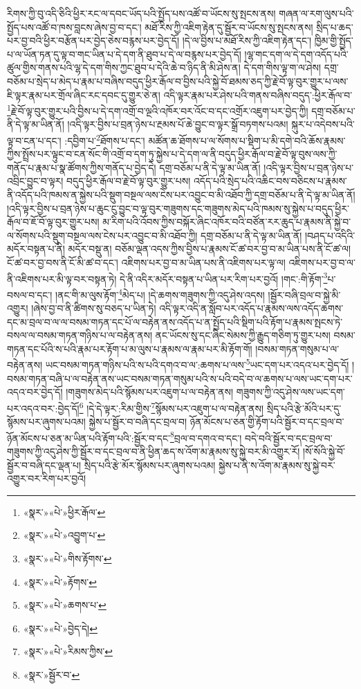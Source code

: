རིགས་ཀྱི་བུ་འདི་ཅིའི་ཕྱིར་རང་ལ་དབང་ཡོད་པའི་སྤྱོད་པས་འཚོ་བ་ཡོངས་སུ་སྤངས་ནས། གཞན་ལ་རག་ལུས་པའི་སྤྱོད་པས་འཚོ་བ་ཁས་བླངས་ཞེས་བྱ་བ་དང་། མཐོ་རིས་ཀྱི་འཇིག་རྟེན་དུ་སྦྱོར་བ་ཡོངས་སུ་སྤངས་ནས། སྲིད་པ་ཆད་པར་བྱ་བའི་ཕྱིར་བརྩོན་པར་བྱེད་ཅེས་བརྙས་པར་བྱེད་དོ། །དེ་ལ་བྱིས་པ་མཐོ་རིས་ཀྱི་འཇིག་རྟེན་དང་། ཁྱིམ་གྱི་སྤྱོད་པ་ལ་ཡོན་ཏན་དུ་ལྟ་བ་གང་ཡིན་པ་དེ་དག་ནི་ཐུབ་པ་དེ་ལ་བརྙས་པར་བྱེད་དོ། །ལྷ་གང་དག་ལ་དེ་དག་འདོད་པའི་ཚུལ་གྱིས་གནས་པའི་ལྷ་དེ་དག་གིས་ཀྱང་ཐུབ་པ་དེའི་ཆེ་བ་ཉིད་ནི་མི་ཤེས་ན། དེ་དག་གིས་ལྟ་ག་ལ་ཤེས། དགྲ་བཅོམ་པ་སྲེད་པ་མེད་པ་རྣམ་པ་བཞིས་བདུད་ཕྱིར་རྒོལ་བ་བྱིས་པའི་སྐྱེ་བོ་ཐམས་ཅད་ཀྱི་རྗེ་བོ་ལྟ་བུར་གྱུར་པ་ལས་ཇི་ལྟར་རྣམ་པར་གྲོལ་ཞིང་རང་དབང་དུ་གྱུར་ཅེ་ན། འདི་ལྟར་རྣམ་པར་ཤེས་པའི་གནས་བཞིས་བདུད་:ཕྱིར་རྒོལ་བ་\footnote{«སྣར་»«པེ་»ཕྱིར་རྒོལ་}རྗེ་བོ་ལྟ་བུར་གྱུར་པའི་བྱིས་པ་དེ་དག་འགྲོ་བ་ལྔའི་འཁོར་བར་འོང་བ་དང་འགྲོར་འཇུག་པར་བྱེད་ཀྱི། དགྲ་བཅོམ་པ་ནི་དེ་ལྟ་མ་ཡིན་ནོ། །འདི་ལྟར་བྱིས་པ་བྲན་ཉེས་པ་རྔམས་པོ་ཆེ་བྱུང་བ་ལྟར་སྒྲོ་བཏགས་པའམ། སྐུར་པ་འདེབས་པའི་ལྟ་བ་ངན་པ་དང་། :དབྱིག་པ་\footnote{«སྣར་»«པེ་»འབྱུག་པ་}ཐོགས་པ་དང་། མཚོན་ཆ་ཐོགས་པ་ལ་སོགས་པ་སྡིག་པ་མི་དགེ་བའི་ཆོས་རྣམས་ཀྱིས་སྤྲོས་པར་ལྟུང་བ་ངན་སོང་གི་འགྲོ་བ་དག་ཏུ་སྐྱེས་པ་དེ་དག་ལ་ནི་བདུད་ཕྱིར་རྒོལ་བ་རྗེ་བོ་ལྟ་བུས་ལས་ཀྱི་གནོད་པ་རྣམ་པ་སྣ་ཚོགས་ཀྱིས་གནོད་པ་བྱེད་དེ། དགྲ་བཅོམ་པ་ནི་དེ་ལྟ་མ་ཡིན་ནོ། །འདི་ལྟར་བྱིས་པ་བྲན་ཉེས་པ་འབྲིང་བྱུང་བ་ལྟར། བདུད་ཕྱིར་རྒོལ་བ་རྗེ་བོ་ལྟ་བུར་གྱུར་པས། འདོད་པའི་སྲེད་པའི་འཆིང་བས་བཅིངས་པ་རྣམས་ནི་འདོད་པའི་ཁམས་ན་སྐྱེས་པའི་སྡུག་བསྔལ་ལས་ངེས་པར་འབྱུང་བ་མི་འཐོབ་ཀྱི་དགྲ་བཅོམ་པ་ནི་དེ་ལྟ་མ་ཡིན་ནོ། །འདི་ལྟར་བྱིས་པ་བྲན་ཉེས་པ་ཆུང་ངུ་བྱུང་བ་ལྟ་བུར་གཟུགས་དང་གཟུགས་མེད་པའི་ཁམས་སུ་སྐྱེས་པ་བདུད་ཕྱིར་རྒོལ་བ་ཇོ་བོ་ལྟ་བུར་གྱུར་པས། མ་རིག་པའི་འོབས་ཀྱིས་བསྐོར་ཞིང་འཁོར་བའི་བཙོན་རར་ཆུད་པ་རྣམས་ནི་སྐྱེ་བ་ལ་སོགས་པའི་སྡུག་བསྔལ་ལས་ངེས་པར་འབྱུང་བ་མི་འཐོབ་ཀྱི། དགྲ་བཅོམ་པ་ནི་དེ་ལྟ་མ་ཡིན་ནོ། །བཤད་པ་འདིའི་མདོར་བསྟན་པ་ནི། མདོར་བསྡུ་ན། བཅོམ་ལྡན་འདས་ཀྱིས་བྱིས་པ་རྣམས་ངོ་ཚ་བར་བྱ་བ་མ་ཡིན་པས་ནི་ངོ་ཚ་ལ། ངོ་ཚ་བར་བྱ་བས་ནི་ངོ་མི་ཚ་བ་དང་། འཇིགས་པར་བྱ་བ་མ་ཡིན་པས་ནི་འཇིགས་པར་ལྟ་ལ། འཇིགས་པར་བྱ་བ་ལ་ནི་འཇིགས་པར་མི་ལྟ་བར་བསྟན་ཏེ། དེ་ནི་འདིར་མདོར་བསྟན་པ་ཡིན་པར་རིག་པར་བྱའོ། །གང་:གི་རྟོག་\footnote{«སྣར་»«པེ་»གིས་རྟོགས་}པ་བསལ་བ་དང་། །ནང་གི་མ་ལུས་རྟོག་\footnote{«སྣར་»«པེ་»རྟོགས་}མེད་པ། །དེ་ཆགས་གཟུགས་ཀྱི་འདུ་ཤེས་འདས། །སྦྱོར་བཞི་བྲལ་བ་སྐྱེ་མི་འགྱུར། །ཞེས་བྱ་བ་ནི་ཚིགས་སུ་བཅད་པ་ཡིན་ཏེ། འདི་ལྟར་འདི་ན་སློབ་པར་འདོད་པ་རྣམས་ལས་འདོད་ཆགས་དང་མ་བྲལ་བ་ལ་ལ་བསམ་གཏན་དང་པོ་ལ་བརྟེན་ནས་འདོད་པ་ན་སྤྱོད་པའི་སྡིག་པའི་རྟོག་པ་རྣམས་སྤངས་ཏེ་བསལ་ལ་བསམ་གཏན་གཉིས་པ་ལ་བརྟེན་ནས། ནང་ཡོངས་སུ་དང་ཞིང་སེམས་ཀྱི་རྒྱུད་གཅིག་ཏུ་གྱུར་པས། བསམ་གཏན་དང་པོའི་ས་པའི་རྣམ་པར་རྟོག་པ་མ་ལུས་པ་རྣམས་ལ་རྣམ་པར་མི་རྟོག་གོ། །བསམ་གཏན་གསུམ་པ་ལ་བརྟེན་ནས། ཡང་བསམ་གཏན་གཉིས་པའི་ས་པའི་དགའ་བ་ལ་:ཆགས་པ་ལས་\footnote{«སྣར་»«པེ་»ཆགས་པ་}ཡང་དག་པར་འདའ་པར་བྱེད་དོ། །བསམ་གཏན་བཞི་པ་ལ་བརྟེན་ནས་ཡང་བསམ་གཏན་གསུམ་པའི་ས་པའི་བདེ་བ་ལ་ཆགས་པ་ལས་ཡང་དག་པར་འདའ་བར་བྱེད་དོ། །གཟུགས་མེད་པའི་སྙོམས་པར་འཇུག་པ་ལ་བརྟེན་ནས། གཟུགས་ཀྱི་འདུ་ཤེས་ལས་ཡང་དག་པར་འདའ་བར་:བྱེད་དོ།\footnote{«སྣར་»«པེ་»བྱེད་དེ།} །དེ་དེ་ལྟར་:རིམ་གྱིས་\footnote{«སྣར་»«པེ་»རིམས་ཀྱིས་}སྙོམས་པར་འཇུག་པ་ལ་བརྟེན་ནས། སྲིད་པའི་རྩེ་མོའི་པར་དུ་སྙོམས་པར་ཞུགས་པའམ། སྐྱེས་པ་སྦྱོར་བ་བཞི་དང་བྲལ་བ། ཉོན་མོངས་པ་ཅན་གྱི་རྟོག་པའི་སྦྱོར་བ་དང་བྲལ་བ་ཉོན་མོངས་པ་ཅན་མ་ཡིན་པའི་རྟོག་པའི་:སྦྱོར་བ་དང་\footnote{«སྣར་»སྦྱོར་བ་}བྲལ་བ་དགའ་བ་དང་། བདེ་བའི་སྦྱོར་བ་དང་བྲལ་བ་གཟུགས་ཀྱི་འདུ་ཤེས་ཀྱི་སྦྱོར་བ་དང་བྲལ་བ་ནི་ཕྱིན་ཆད་ས་འོག་མ་རྣམས་སུ་སྐྱེ་བར་མི་འགྱུར་རོ། །སོ་སོའི་སྐྱེ་བོ་སྦྱོར་བ་བཞི་དང་ལྡན་པ། སྲིད་པའི་རྩེ་མོར་སྙོམས་པར་ཞུགས་པའམ། སྐྱེས་པ་ནི་ས་འོག་མ་རྣམས་སུ་སྐྱེ་བར་འགྱུར་བར་རིག་པར་བྱའོ། 